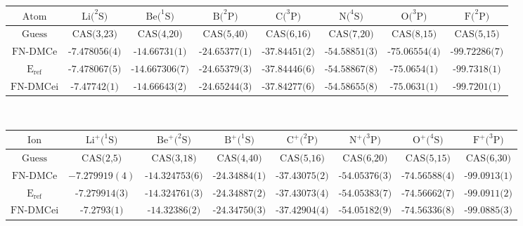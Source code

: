 \documentclass[aps,prl,superscriptaddress,groupedaddress]{revtex4}
\begin{document}
\begin{table*}[htpb!]
\setlength{\extrarowheight}{3pt}
\begin{tabular}{*{1}{*{8}{c}}}
\hline\hline
$\text{Atom}$ & $\text{Li}(^2\text{S)}$ & $\text{Be}(^1\text{S)}$ & $\text{B}(^2\text{P)}$ & $\text{C}(^3\text{P)}$ & $\text{N}(^4\text{S)}$ & $\text{O}(^3\text{P)}$ & $\text{F}(^2\text{P)}$ \\ \hline
$\text{Guess}$ & $\text{CAS(3,23)}$ & $\text{CAS(4,20)}$ & $\text{CAS(5,40)}$ & $\text{CAS(6,16)}$ & $\text{CAS(7,20)}$ & $\text{CAS(8,15)}$ & $\text{CAS(5,15)}$ \\
$\text{FN-DMCe}$ & $\text{-7.478056(4)}$ & $\text{-14.66731(1)}$ & $\text{-24.65377(1)}$ & $\text{-37.84451(2)}$ & $\text{-54.58851(3)}$ & $\text{-75.06554(4)}$ & $\text{-99.72286(7)}$ \\
$\text{E}_{\text{ref}}$ & $\text{-7.478067(5)}$ & $\text{-14.667306(7)}$ & $\text{-24.65379(3)}$ & $\text{-37.84446(6)}$ & $\text{-54.58867(8)}$ & $\text{-75.0654(1)}$ & $\text{-99.7318(1)}$ \\
$\text{FN-DMCei}$ & $\text{-7.47742(1)}$ & $\text{-14.66643(2)}$ & $\text{-24.65244(3)}$ & $\text{-37.84277(6)}$ & $\text{-54.58655(8)}$ & $\text{-75.0631(1)}$ & $\text{-99.7201(1)}$ \\
\hline
\end{tabular} \\ 
\begin{tabular}{*{1}{*{8}{c}}}
$\text{Ion}$ & $\text{Li}^+(^1\text{S)}$ & $\text{Be}^+(^2\text{S)}$ & $\text{B}^+(^1\text{S)}$ & $\text{C}^+(^2\text{P)}$ & $\text{N}^+(^3\text{P)}$ & $\text{O}^+(^4\text{S)}$ & $\text{F}^+(^3\text{P)}$ \\ \hline
$\text{Guess}$ & $\text{CAS(2,5)}$ & $\text{CAS(3,18)}$ & $\text{CAS(4,40)}$ & $\text{CAS(5,16)}$ & $\text{CAS(6,20)}$ & $\text{CAS(5,15)}$ & $\text{CAS(6,30)}$ \\
$\text{FN-DMCe}$ & $-7.279919(4)$ & $\text{-14.324753(6)}$ & $\text{-24.34884(1)}$ & $\text{-37.43075(2)}$ & $\text{-54.05376(3)}$ & $\text{-74.56588(4)}$ & $\text{-99.0913(1)}$ \\
$\text{E}_{\text{ref}}$ & $\text{-7.279914(3)}$ & $\text{-14.324761(3)}$ & $\text{-24.34887(2)}$ & $\text{-37.43073(4)}$ & $\text{-54.05383(7)}$ & $\text{-74.56662(7)}$ & $\text{-99.0911(2)}$ \\
$\text{FN-DMCei}$ & $\text{-7.2793(1)}$ & $\text{-14.32386(2)}$ & $\text{-24.34750(3)}$ & $\text{-37.42904(4)}$ & $\text{-54.05182(9)}$ & $\text{-74.56336(8)}$ & $\text{-99.0885(3)}$ \\

\end{tabular}
\end{table*}
\end{document}
